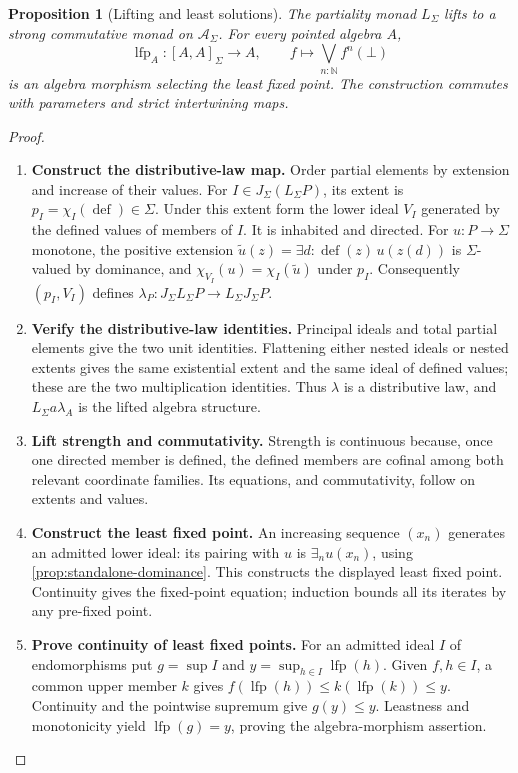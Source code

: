 \documentclass[11pt,a4paper]{article}
\numberwithin{algorithm}{section}
\numberwithin{equation}{section}
\newtheorem{proposition}[proposition]{Proposition}
\theoremstyle{definition}
\theoremstyle{remark}
\theoremstyle{plain}
\newcommand{\N}{\mathbb N}
\newcommand{\AS}{\mathcal A_{\Sigma}}
\newcommand{\J}{J_{\Sigma}}
\newcommand{\LL}{L_{\Sigma}}
\theoremstyle{definition}
\theoremstyle{plain}
\begin{document}
\begin{proposition}[Lifting and least solutions]\label{prop:standalone-recursion}
The partiality monad $\LL$ lifts to a strong commutative monad on $\AS$.
For every pointed algebra $A$,
\[
 \operatorname{lfp}_A:[A,A]_\Sigma\longrightarrow A,\qquad
 f\longmapsto\bigvee_{n:\N}f^n(\bot)
\]
is an algebra morphism selecting the least fixed point. The construction
commutes with parameters and strict intertwining maps.
\end{proposition}
\begin{proof}\leavevmode
\begin{enumerate}[leftmargin=*,align=left]
\item \textbf{Construct the distributive-law map.}
Order partial elements by extension and increase of their values.
For $I\in\J(\LL P)$, its extent is
$p_I=\chi_I(\operatorname{def})\in\Sigma$. Under this extent form the
lower ideal $V_I$ generated by the defined values of members of $I$.
It is inhabited and directed. For $u:P\to\Sigma$ monotone, the
positive extension
$\widetilde u(z)=\exists d:\operatorname{def}(z)\,u(z(d))$
is $\Sigma$-valued by dominance, and
$\chi_{V_I}(u)=\chi_I(\widetilde u)$ under $p_I$.
Consequently $(p_I,V_I)$ defines
$\lambda_P:\J\LL P\to\LL\J P$.

\item \textbf{Verify the distributive-law identities.}
Principal ideals and total partial elements give the two unit
identities. Flattening either nested ideals or nested extents gives
the same existential extent and the same ideal of defined values;
these are the two multiplication identities. Thus $\lambda$ is a
distributive law, and $\LL a\lambda_A$ is the lifted algebra structure.

\item \textbf{Lift strength and commutativity.}
Strength is continuous because, once one directed member is defined,
the defined members are cofinal among both relevant coordinate
families. Its equations, and commutativity, follow on extents and values.

\item \textbf{Construct the least fixed point.}
An increasing sequence $(x_n)$ generates an admitted lower ideal:
its pairing with $u$ is $\exists_nu(x_n)$, using
\cref{prop:standalone-dominance}. This constructs the displayed
least fixed point. Continuity gives the fixed-point equation;
induction bounds all its iterates by any pre-fixed point.

\item \textbf{Prove continuity of least fixed points.}
For an admitted ideal $I$ of endomorphisms put
$g=\sup I$ and $y=\sup_{h\in I}\operatorname{lfp}(h)$.
Given $f,h\in I$, a common upper member $k$ gives
$f(\operatorname{lfp}(h))\le k(\operatorname{lfp}(k))\le y$.
Continuity and the pointwise supremum give $g(y)\le y$.
Leastness and monotonicity yield
$\operatorname{lfp}(g)=y$, proving the algebra-morphism assertion.


\end{enumerate}
\end{proof}
\end{document}
